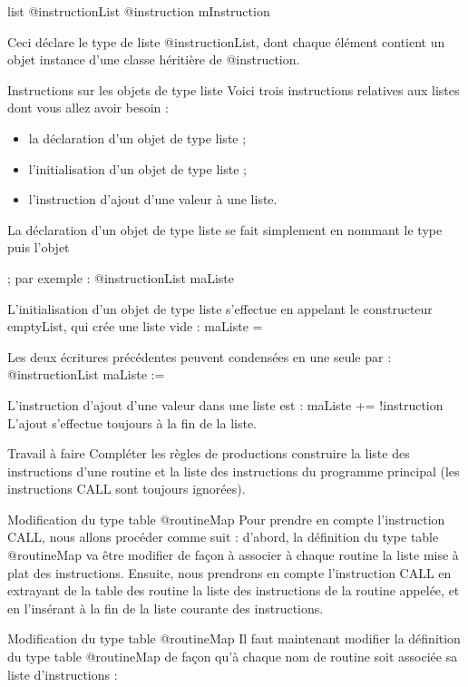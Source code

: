 \begin{galgascode}
list @instructionList {
  @instruction mInstruction
}
\end{galgascode}

Ceci déclare le type de liste @instructionList, dont chaque élément contient un objet instance d'une classe héritière de @instruction.

Instructions sur les objets de type liste
Voici trois instructions relatives aux listes dont vous allez avoir besoin :
\begin{itemize}
  \item la déclaration d'un objet de type liste ;
  \item l'initialisation d'un objet de type liste ;
  \item l'instruction d'ajout d'une valeur à une liste.
\end{itemize}

La déclaration d'un objet de type liste se fait simplement en nommant le type puis l'objet 

; par exemple :
	@instructionList maListe

L'initialisation d'un objet de type liste s'effectue en appelant le constructeur emptyList, qui crée une liste vide :
	maListe = {}

Les deux écritures précédentes peuvent condensées en une seule par :
	@instructionList maListe := {}

L'instruction d'ajout d'une valeur dans une liste est :
	maListe += !instruction
L'ajout s'effectue toujours à la fin de la liste.

Travail à faire
Compléter les règles de productions construire la liste des instructions d'une routine et la liste des instructions du programme principal (les instructions CALL sont toujours ignorées).

Modification du type table @routineMap
Pour prendre en compte l’instruction CALL, nous allons procéder comme suit : d’abord, la définition du type table @routineMap va être modifier de façon à associer à chaque routine la liste mise à plat des instructions. Ensuite, nous prendrons en compte l’instruction CALL en extrayant de la table des routine la liste des instructions de la routine appelée, et en l’insérant à la fin de la liste courante des instructions.

Modification du type table @routineMap
Il faut maintenant modifier la définition du type table @routineMap de façon qu'à chaque nom de routine soit associée sa liste d'instructions :


